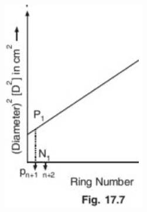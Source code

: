 \documentclass[10pt]{article}
\begin{document}
\includegraphics[max width=\textwidth]{a2978538246081aa91be444fc9e0a5aa-4}
\end{document}
